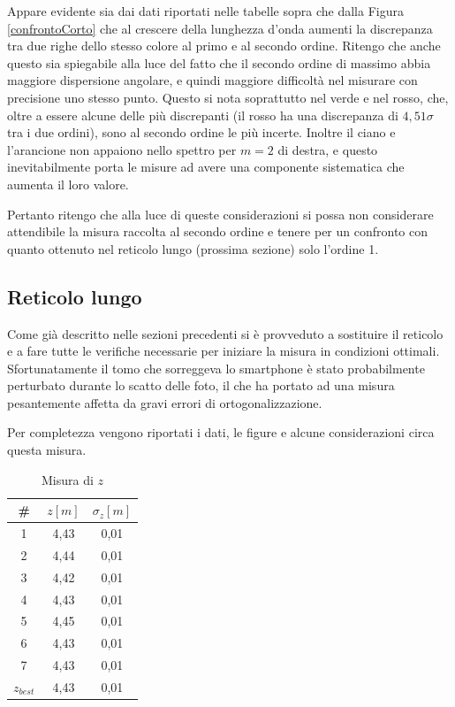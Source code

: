 \documentclass{article}
\begin{document}
Appare evidente sia dai dati riportati nelle tabelle sopra che dalla Figura \ref{confrontoCorto} che al crescere della lunghezza d'onda aumenti la discrepanza tra due righe dello stesso colore al primo e al secondo ordine. Ritengo che anche questo sia spiegabile alla luce del fatto che il secondo ordine di massimo abbia maggiore dispersione angolare, e quindi maggiore difficoltà nel misurare con precisione uno stesso punto. Questo si nota soprattutto nel verde e nel rosso, che, oltre a essere alcune delle più discrepanti (il rosso ha una discrepanza di $4,51\sigma$ tra i due ordini), sono al secondo ordine le più incerte. Inoltre il ciano e l'arancione non appaiono nello spettro per $m=2$ di destra, e questo inevitabilmente porta le misure ad avere una componente sistematica che aumenta il loro valore.

\vspace{3mm}

Pertanto ritengo che alla luce di queste considerazioni si possa non considerare attendibile la misura raccolta al secondo ordine e tenere per un confronto con quanto ottenuto nel reticolo lungo (prossima sezione) solo l'ordine 1.

\pagebreak
\subsection{Reticolo lungo}

Come già descritto nelle sezioni precedenti si è provveduto a sostituire il reticolo e a fare tutte le verifiche necessarie per iniziare la misura in condizioni ottimali. Sfortunatamente il tomo che sorreggeva lo smartphone è stato probabilmente perturbato durante lo scatto delle foto, il che ha portato ad una misura pesantemente affetta da gravi errori di ortogonalizzazione. 

\vspace{3mm}

Per completezza vengono riportati i dati, le figure e alcune considerazioni circa questa misura.

\begin{table}[h]
    \centering
        \begin{tabular}{||c|c|c||}
            \hline
            \# & $z [m]$ & $\sigma_z [m]$\\
            \hline
            1 & 4,43 & 0,01 \\
            2 & 4,44 & 0,01 \\
            3 & 4,42 & 0,01 \\
            4 & 4,43 & 0,01 \\
            5 & 4,45 & 0,01 \\
            6 & 4,43 & 0,01 \\
            7 & 4,43 & 0,01 \\
            \hline
            $z_{best}$ & 4,43 & 0,01 \\
            \hline
        \end{tabular}
    \caption{Misura di $z$}
\end{table}
\end{document}
